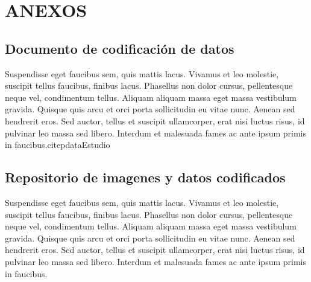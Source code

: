
\chapter{ANEXOS}

\section{Documento de codificación de datos}
\label{ane:anexo1}
Suspendisse eget faucibus sem, quis mattis lacus. Vivamus et leo molestie, suscipit tellus faucibus, finibus lacus. Phasellus non dolor cursus, pellentesque neque vel, condimentum tellus. Aliquam aliquam massa eget massa vestibulum gravida. Quisque quis arcu et orci porta sollicitudin eu vitae nunc. Aenean sed hendrerit eros. Sed auctor, tellus et suscipit ullamcorper, erat nisi luctus risus, id pulvinar leo massa sed libero. Interdum et malesuada fames ac ante ipsum primis in faucibus.citep{dataEstudio}


\section{Repositorio de imagenes y datos codificados}

Suspendisse eget faucibus sem, quis mattis lacus. Vivamus et leo molestie, suscipit tellus faucibus, finibus lacus. Phasellus non dolor cursus, pellentesque neque vel, condimentum tellus. Aliquam aliquam massa eget massa vestibulum gravida. Quisque quis arcu et orci porta sollicitudin eu vitae nunc. Aenean sed hendrerit eros. Sed auctor, tellus et suscipit ullamcorper, erat nisi luctus risus, id pulvinar leo massa sed libero. Interdum et malesuada fames ac ante ipsum primis in faucibus.



